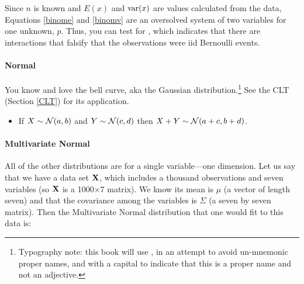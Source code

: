 Since $n$ is known and $E(x)$ and $\operatorname{var}(x)$ are values calculated from
the data, Equations \ref{binome} and \ref{binomv} are an oversolved
system of two variables for one unknown, $p$. Thus, you can test for
, which indicates that there are interactions that
falsify that the observations were iid Bernoulli events.

\paragraph{Normal}

You know and love the bell curve, aka the Gaussian
distribution.\footnote{Typography note: this book will use ,
in an attempt to avoid un-mnemonic proper names, and with a capital to indicate
that this is a proper name and not an adjective.} See the CLT (Section
\ref{CLT}) for its application.


 

\begin{itemize}
\item If $X \sim {\cal N} (a,b)$ and $Y \sim {\cal N} (c,d)$ then $X+Y \sim {\cal N}
(a+c,b+d)$.
\end{itemize}

\paragraph{Multivariate Normal}
All of the other distributions are for a single variable---one
dimension. Let us say that we have a data set ${\bf X}$, which includes a
thousand observations and seven variables (so ${\bf X}$ is a 1000$\times$7
matrix). We know its mean is
$\mu$ (a vector of length seven) and that the covariance among the
variables is $\Sigma$ (a seven by seven matrix). Then the Multivariate
Normal distribution that one would fit to this data is:

